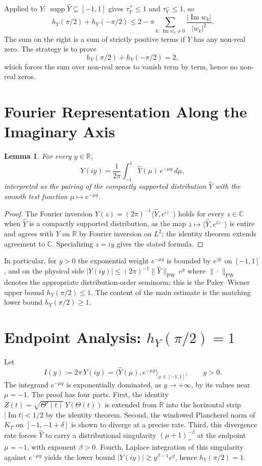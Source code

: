 \documentclass[11pt,a4paper]{article}
\theoremstyle{plain}
\newtheorem{lemma}[theorem]{Lemma}
\theoremstyle{definition}
\newcommand{\R}{\mathbb{R}}
\newcommand{\C}{\mathbb{C}}
\DeclareMathOperator{\supp}{supp}
\DeclareMathOperator{\Imag}{Im}
\begin{document}
Applied to $Y$: $\supp\hat Y\subseteq[-1,1]$ gives $\tau_Y^+\le 1$ and $\tau_Y^-\le 1$, so
\begin{equation}\label{eq:YLevin}
h_Y(\pi/2)+h_Y(-\pi/2)\le 2-\pi\!\!\sum_{k:\,\Imag w_k\neq 0}\!\!\frac{|\Imag w_k|}{|w_k|^2}.
\end{equation}
The sum on the right is a sum of strictly positive terms if $Y$ has any non-real zero. The strategy is to prove
\[
h_Y(\pi/2)+h_Y(-\pi/2)=2,
\]
which forces the sum over non-real zeros to vanish term by term, hence no non-real zeros.

\section{Fourier Representation Along the Imaginary Axis}

\begin{lemma}\label{lem:imagrep}
For every $y\in\R$,
\[
Y(iy)=\frac{1}{2\pi}\int_{-1}^{1}\hat Y(\mu)\,e^{-\mu y}\,d\mu,
\]
interpreted as the pairing of the compactly supported distribution $\hat Y$ with the smooth test function $\mu\mapsto e^{-\mu y}$.
\end{lemma}

\begin{proof}
The Fourier inversion $Y(z)=(2\pi)^{-1}\langle\hat Y,e^{iz\,\cdot}\rangle$ holds for every $z\in\C$ when $\hat Y$ is a compactly supported distribution, as the map $z\mapsto\langle\hat Y,e^{iz\,\cdot}\rangle$ is entire and agrees with $Y$ on $\R$ by Fourier inversion on $L^2$; the identity theorem extends agreement to $\C$. Specializing $z=iy$ gives the stated formula.
\end{proof}

In particular, for $y>0$ the exponential weight $e^{-\mu y}$ is bounded by $e^{|y|}$ on $[-1,1]$, and on the physical side $|Y(iy)|\le(2\pi)^{-1}\|\hat Y\|_{\mathrm{PW}}\,e^y$ where $\|\cdot\|_{\mathrm{PW}}$ denotes the appropriate distribution-order seminorm; this is the Paley--Wiener upper bound $h_Y(\pi/2)\le 1$. The content of the main estimate is the matching lower bound $h_Y(\pi/2)\ge 1$.

\section{Endpoint Analysis: $h_Y(\pi/2)=1$}

Let
\[
I(y):=2\pi\,Y(iy)=\langle\hat Y(\mu),e^{-\mu y}\rangle_{\mu\in[-1,1]},\qquad y>0.
\]
The integrand $e^{-\mu y}$ is exponentially dominated, as $y\to+\infty$, by its values near $\mu=-1$. The proof has four parts. First, the identity $Z(t)=\sqrt{\Theta'(t)}\,Y(\Theta(t))$ is extended from $\R$ into the horizontal strip $|\Imag t|<1/2$ by the identity theorem. Second, the windowed Plancherel norm of $K_T$ on $[-1,-1+\delta]$ is shown to diverge at a precise rate. Third, this divergence rate forces $\hat Y$ to carry a distributional singularity $(\mu+1)_+^{-\beta}$ at the endpoint $\mu=-1$, with exponent $\beta>0$. Fourth, Laplace integration of this singularity against $e^{-\mu y}$ yields the lower bound $|Y(iy)|\gtrsim y^{\beta-1}e^y$, hence $h_Y(\pi/2)=1$.
\end{document}
